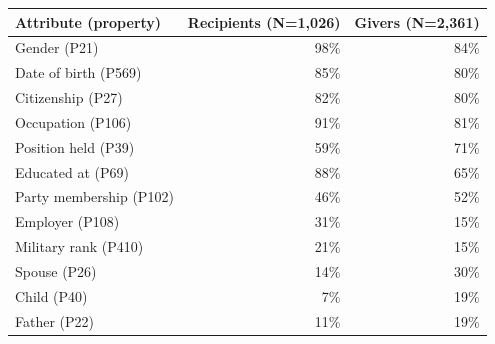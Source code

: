 \begin{tabular}{lrr}
\toprule
Attribute (property) & Recipients (N=1,026) & Givers (N=2,361) \\
\midrule
Gender (P21) & 98\% & 84\% \\
Date of birth (P569) & 85\% & 80\% \\
Citizenship (P27) & 82\% & 80\% \\
Occupation (P106) & 91\% & 81\% \\
Position held (P39) & 59\% & 71\% \\
Educated at (P69) & 88\% & 65\% \\
Party membership (P102) & 46\% & 52\% \\
Employer (P108) & 31\% & 15\% \\
Military rank (P410) & 21\% & 15\% \\
Spouse (P26) & 14\% & 30\% \\
Child (P40) & 7\% & 19\% \\
Father (P22) & 11\% & 19\% \\
\bottomrule
\end{tabular}
